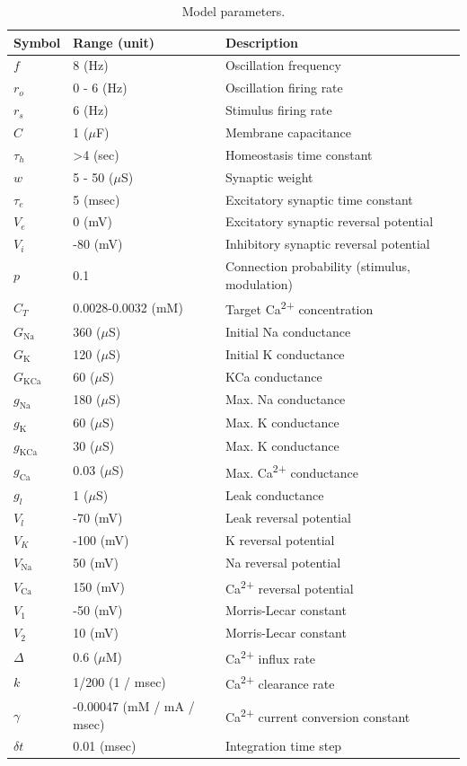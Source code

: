 \documentclass{article}
\begin{document}
\begin{table}
\centering
\begin{tabular}{@{}lll@{}}
\toprule
\textbf{Symbol} & \textbf{Range (unit)} & \textbf{Description} \\ \midrule
$f$ & 8 (Hz) & Oscillation frequency \\
$r_o$ & 0 - 6 (Hz) & Oscillation firing rate \\
$r_s$ & 6 (Hz) & Stimulus firing rate \\
$C$ & 1 ($\mu$F) & Membrane capacitance \\
$\tau_h$ & \textgreater 4 (sec) & Homeostasis time constant \\
$w$ & 5 - 50 ($\mu$S) & Synaptic weight \\
$\tau_e$ & 5 (msec) & Excitatory synaptic time constant \\
$V_e$ & 0 (mV) & Excitatory synaptic reversal potential \\
$V_i$ & -80 (mV) & Inhibitory synaptic reversal potential \\
$p$ & 0.1 & Connection probability (stimulus, modulation) \\
$C_T$ & 0.0028-0.0032 (mM) & Target Ca\textsuperscript{2+} concentration \\
$G_\text{Na}$ & 360 ($\mu$S) & Initial Na conductance \\
$G_\text{K}$ & 120 ($\mu$S) & Initial K conductance \\
$G_\text{KCa}$ & 60 ($\mu$S) & KCa conductance \\
$g_\text{Na}$ & 180 ($\mu$S) & Max. Na conductance \\
$g_\text{K}$ & 60 ($\mu$S) & Max. K conductance \\
$g_\text{KCa}$ & 30 ($\mu$S) & Max. K conductance \\
$g_\text{Ca}$ & 0.03 ($\mu$S) & Max. Ca\textsuperscript{2+} conductance \\
$g_l$ & 1 ($\mu$S) & Leak conductance \\
$V_l$ & -70 (mV) & Leak reversal potential \\
$V_K$ & -100 (mV) & K reversal potential \\
$V_\text{Na}$ & 50 (mV) & Na reversal potential \\
$V_\text{Ca}$ & 150 (mV) & Ca\textsuperscript{2+} reversal potential \\
$V_\text{1}$ & -50 (mV) & Morris-Lecar constant \\
$V_\text{2}$ & 10 (mV) & Morris-Lecar constant \\
$\Delta$ & 0.6 ($\mu$M) & Ca\textsuperscript{2+} influx rate \\
$k$ & 1/200 (1 / msec) & Ca\textsuperscript{2+} clearance rate \\
$\gamma$ & -0.00047 (mM / mA / msec) & Ca\textsuperscript{2+} current conversion constant \\
$\delta t$ & 0.01 (msec) & Integration time step \\ \bottomrule
\end{tabular}
\caption{Model parameters.}
\label{table:params}
\end{table}

\newpage


\end{document}
